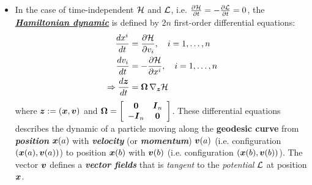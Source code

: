 \documentclass[11pt]{article}
\begin{document}
\begin{itemize}
\begin{proof}
\begin{align*}
&= \sum_{i}d\paren{\partdiff{\cL}{\dot{x}^{i}}\dot{x}^{i}-\cL}  +  \sum_{i}\brac{\partdiff{\cL}{x^{i}}dx^{i} -  \dot{x}^{i}d\paren{\partdiff{\cL}{\dot{x}^{i}}}} + \partdiff{\cL}{t}dt \\
d\paren{\sum_{i}\partdiff{\cL}{\dot{x}^{i}}\dot{x}^{i}-\cL} &=   \sum_{i}\brac{-\partdiff{\cL}{x^{i}}dx^{i} +  \dot{x}^{i}d\paren{\partdiff{\cL}{\dot{x}^{i}}}} - \partdiff{\cL}{t}dt  \\
d\paren{\sum_{i}v_i\dot{x}^{i}-\cL} &=   \sum_{i}\paren{-\partdiff{\cL}{x^{i}}}dx^{i} + \sum_{i} \dot{x}^{i}dv_i - \partdiff{\cL}{t}dt \quad \text{ let }v_i := \partdiff{\cL}{\dot{x}^{i}} \\
d\cH &= \sum_{i}\paren{-\partdiff{\cL}{x^{i}}}dx^{i} + \sum_{i} \dot{x}^{i}dv_i  - \partdiff{\cL}{t}dt \\
\text{Also }d\cH &= \sum_{i}\partdiff{\cH}{x^{i}}dx^{i}  + \sum_{i}\partdiff{\cH}{v_{i}}dv_i + \partdiff{\cH}{t}dt
\end{align*}
Therefore we have 
\begin{align*}
\partdiff{\cH}{x^{i}} &= - \partdiff{\cL}{x^{i}} =  - \frac{d}{dt}\partdiff{\cL}{\dot{x}} = - \dot{v}_{i} \quad \text{(by Euler-Lagrange equation)}\\
\partdiff{\cH}{v_{i}} &=  \dot{x}^{i} \\
\partdiff{\cH}{t} &=  - \partdiff{\cL}{t} \qed
\end{align*} 
\end{proof}
\item In the case of time-independent ${\mathcal H}$ and ${\mathcal L}$, i.e. $\frac{\partial {\mathcal H}}{ \partial t} =  - \frac{\partial {\mathcal L}}{ \partial t} = 0$, the \underline{\emph{\textbf{Hamiltonian dynamic}}} is defined by $2n$ first-order differential equations:
\begin{align}
\frac{d x^{i}}{dt} &=  \frac{\partial {\mathcal H}}{ \partial v_{i}}, \quad  i=1,\ldots, n \nonumber\\
\frac{d v_{i}}{dt} &= - \frac{\partial {\mathcal H}}{ \partial x^{i}}, \quad  i=1,\ldots, n \label{eqn: Hamilton_dynamics_general}\\
\Rightarrow \frac{d\boldsymbol{z}}{dt} &= \boldsymbol{\Omega}\,\nabla_{\boldsymbol{z}}{{\mathcal H}} \label{eqn: Hamilton_dynamics_general_combine}
\end{align} where $\boldsymbol{z}:= (\boldsymbol{x}, \boldsymbol{v})$ and $\boldsymbol{\Omega} = \left[\begin{array}{cc}
\boldsymbol{0} & \boldsymbol{I}_{n}  \\
-\boldsymbol{I}_{n}  & \boldsymbol{0}  
\end{array}\right]$. 
These differential equations describes the dynamic of a particle moving along the \textbf{geodesic curve} from \emph{\textbf{position}} $\boldsymbol{x}(a)$ with \emph{\textbf{velocity}} (or \emph{\textbf{momentum}}) $\boldsymbol{v}(a)$ (i.e. configuration $(\boldsymbol{x}(a), \boldsymbol{v}(a))$) to position $\boldsymbol{x}(b)$ with $\boldsymbol{v}(b)$ (i.e. configuration $(\boldsymbol{x}(b), \boldsymbol{v}(b))$). The vector $\boldsymbol{v}$ defines a \emph{\textbf{vector fields}} that is \emph{tangent} to the \emph{potential} ${\mathcal L}$ at position $\boldsymbol{x}$.


\end{itemize}
\end{document}
